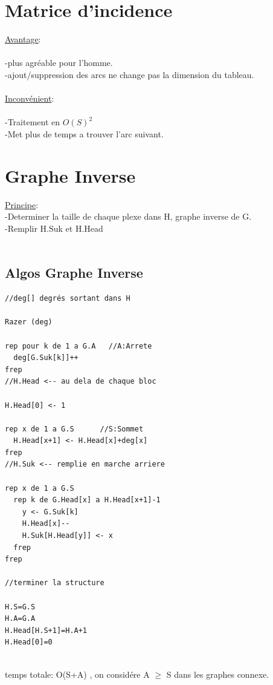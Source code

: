 \documentclass[a4paper,12pt,openany]{book}
\begin{document}
\section{Matrice d'incidence}

\underline{Avantage}: \\
\\
-plus agréable pour l'homme.\\
-ajout/suppression des arcs ne change pas la dimension du tableau.\\
\\
\underline{Inconvénient}:\\
\\
-Traitement en $O(S)^2$\\
-Met plus de temps a trouver l'arc suivant.\\




\section{Graphe Inverse}

\underline{Principe}: \\
-Determiner la taille de chaque plexe dans H, graphe inverse de G.\\
-Remplir H.Suk et H.Head\\
\\

\subsection{Algos Graphe Inverse}

\begin{verbatim}
//deg[] degrés sortant dans H

Razer (deg)

rep pour k de 1 a G.A   //A:Arrete
  deg[G.Suk[k]]++
frep
//H.Head <-- au dela de chaque bloc

H.Head[0] <- 1

rep x de 1 a G.S      //S:Sommet
  H.Head[x+1] <- H.Head[x]+deg[x]
frep
//H.Suk <-- remplie en marche arriere 

rep x de 1 a G.S
  rep k de G.Head[x] a H.Head[x+1]-1
    y <- G.Suk[k]
    H.Head[x]--
    H.Suk[H.Head[y]] <- x
  frep
frep

//terminer la structure

H.S=G.S
H.A=G.A
H.Head[H.S+1]=H.A+1
H.Head[0]=0
\end{verbatim}
\\
temps totale: O(S+A) , on considére A $\geqslant$ S dans les graphes connexe.\\
\end{document}
